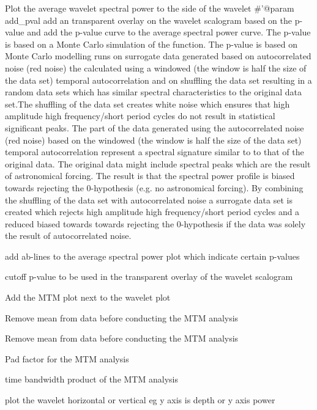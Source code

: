 \documentclass[a4paper]{book}
\begin{document}
\begin{Arguments}
\begin{ldescription}
\item[\code{add\_avg}] Plot the average wavelet spectral power to the side of the wavelet 
\#'@param add\_pval add an transparent overlay on the wavelet scalogram based on the p-value and add the p-value curve to the
average spectral power curve. The p-value is based on a Monte Carlo simulation of the  function.
The p-value is based on Monte Carlo modelling runs on surrogate data generated based on autocorrelated noise (red noise)
the calculated using a windowed (the window is half the size of the data set) temporal autocorrelation
and on shuffling the data set resulting in a random data sets which has similar spectral characteristics
to the original data set.The shuffling of the data set creates white noise which ensures that high amplitude high frequency/short
period cycles do not result in statistical significant peaks. The part of the data generated using the  autocorrelated noise (red noise)
based on the windowed  (the window is half the size of the data set) temporal autocorrelation represent a spectral signature similar to
to that of the original data. The original data might include spectral peaks which are the result of astronomical
forcing. The result is that the spectral power profile is biased towards rejecting the 0-hypothesis (e.g. no astronomical forcing).
By combining the shuffling of the data set with autocorrelated noise a surrogate data set is created which rejects
high amplitude high frequency/short period cycles and a reduced biased towards towards rejecting the 0-hypothesis if the data was
solely the result of autocorrelated noise. 

\item[\code{pval\_abline}] add ab-lines to the average spectral power plot which indicate certain p-values 

\item[\code{pval\_cutoff}] cutoff p-value to be used in the transparent overlay of the wavelet scalogram 

\item[\code{add\_MTM}] Add the MTM  plot next to the wavelet plot 

\item[\code{demean\_mtm}] Remove mean from data before conducting the MTM analysis 

\item[\code{detrend\_mtm}] Remove mean from data before conducting the MTM analysis 

\item[\code{padfac\_mtm}] Pad factor for the MTM analysis 

\item[\code{tbw\_mtm}] time bandwidth product of the MTM analysis  

\item[\code{plot\_horizontal}] plot the wavelet horizontal or vertical eg y axis is depth or y axis power 
\end{ldescription}
\end{Arguments}
\end{document}
